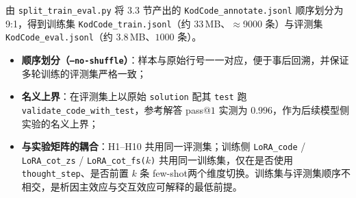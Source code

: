
由 \texttt{split\_train\_eval.py} 将 3.3 节产出的 \texttt{KodCode\_annotate.jsonl} 顺序划分为 9{:}1，得到训练集 \texttt{KodCode\_train.jsonl}（约 $33$\,MB、$\approx$9000 条）与评测集 \texttt{KodCode\_eval.jsonl}（约 $3.8$\,MB、$1000$ 条）。

\begin{itemize}
    \item \textbf{顺序划分（\texttt{--no-shuffle}）}：样本与原始行号一一对应，便于事后回溯，并保证多轮训练的评测集严格一致；
    \item \textbf{名义上界}：在评测集上以原始 \texttt{solution} 配其 \texttt{test} 跑 \texttt{validate\_code\_\allowbreak with\_test}，参考解答 pass@$1$ 实测为 $0.996$，作为后续模型侧实验的名义上界；
    \item \textbf{与实验矩阵的耦合}：H1--H10 共用同一评测集；训练侧 \texttt{LoRA\_code} / \texttt{LoRA\_cot\_\allowbreak zs} / \texttt{LoRA\_cot\_fs($k$)} 共用同一训练集，仅在是否使用 \texttt{thought\_step}、是否前置 $k$ 条 few-shot两个维度切换。训练集与评测集顺序不相交，是析因主效应与交互效应可解释的最低前提。
\end{itemize}
